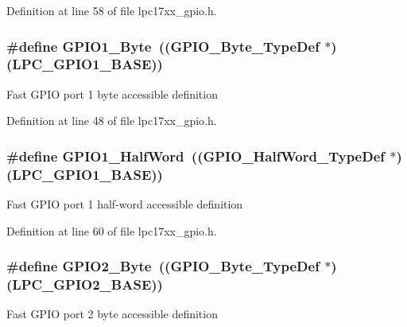 \-Definition at line 58 of file lpc17xx\-\_\-gpio.\-h.

\hypertarget{group___g_p_i_o___public___macros_ga06af9dfab07e8c2a5f1a6db198896e84}{
\subsubsection[{\-G\-P\-I\-O1\-\_\-\-Byte}]{\setlength{\rightskip}{0pt plus 5cm}\#define {\bf \-G\-P\-I\-O1\-\_\-\-Byte}~(({\bf \-G\-P\-I\-O\-\_\-\-Byte\-\_\-\-Type\-Def} $\ast$)(\-L\-P\-C\-\_\-\-G\-P\-I\-O1\-\_\-\-B\-A\-S\-E))}}\label{group___g_p_i_o___public___macros_ga06af9dfab07e8c2a5f1a6db198896e84}
\-Fast \-G\-P\-I\-O port 1 byte accessible definition 

\-Definition at line 48 of file lpc17xx\-\_\-gpio.\-h.

\hypertarget{group___g_p_i_o___public___macros_gaa0c96e5acb3905bd46033e49b0c0c2c2}{
\subsubsection[{\-G\-P\-I\-O1\-\_\-\-Half\-Word}]{\setlength{\rightskip}{0pt plus 5cm}\#define {\bf \-G\-P\-I\-O1\-\_\-\-Half\-Word}~(({\bf \-G\-P\-I\-O\-\_\-\-Half\-Word\-\_\-\-Type\-Def} $\ast$)(\-L\-P\-C\-\_\-\-G\-P\-I\-O1\-\_\-\-B\-A\-S\-E))}}\label{group___g_p_i_o___public___macros_gaa0c96e5acb3905bd46033e49b0c0c2c2}
\-Fast \-G\-P\-I\-O port 1 half-\/word accessible definition 

\-Definition at line 60 of file lpc17xx\-\_\-gpio.\-h.

\hypertarget{group___g_p_i_o___public___macros_ga047ebf1e19ebfdd3abf05ba23491fa05}{
\subsubsection[{\-G\-P\-I\-O2\-\_\-\-Byte}]{\setlength{\rightskip}{0pt plus 5cm}\#define {\bf \-G\-P\-I\-O2\-\_\-\-Byte}~(({\bf \-G\-P\-I\-O\-\_\-\-Byte\-\_\-\-Type\-Def} $\ast$)(\-L\-P\-C\-\_\-\-G\-P\-I\-O2\-\_\-\-B\-A\-S\-E))}}\label{group___g_p_i_o___public___macros_ga047ebf1e19ebfdd3abf05ba23491fa05}
\-Fast \-G\-P\-I\-O port 2 byte accessible definition 

